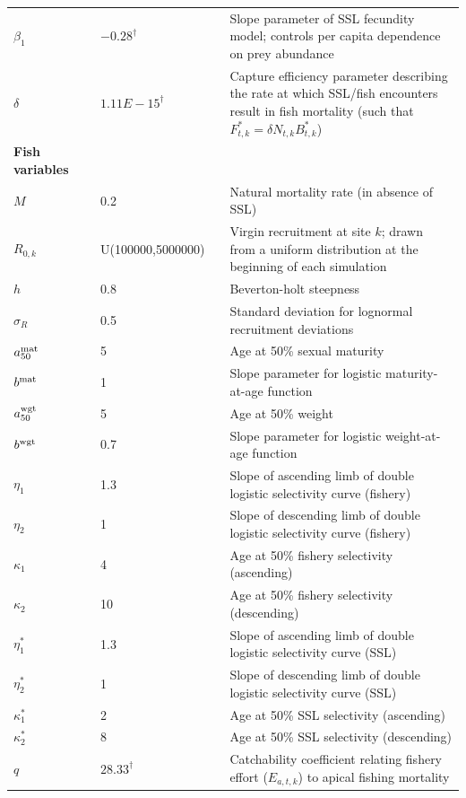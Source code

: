\documentclass[nonumbib,leqno]{nrc1}
\begin{document}
\begin{table}
\begin{tabular}{p{3cm}lll p{9cm}}
$\beta_1$ & & $-0.28^\dag$ & & Slope parameter of SSL fecundity model; controls per capita dependence
                    on prey abundance \\
$\delta$ & & $1.11E-15^\dag$ & & Capture efficiency parameter describing the rate at which SSL/fish encounters result in fish mortality (such that $F_{t,k}^*=\delta N_{t,k} B_{t,k}^*$) \\
\midrule
\multicolumn{1}{l}{\textbf{Fish variables}}  \\
$M$ & & 0.2 & & Natural mortality rate (in absence of SSL) \\ [2pt]
$R_{0,k}$ & & U(100000,5000000) & & Virgin recruitment at site $k$; drawn from a uniform distribution at the beginning of each simulation \\
$h$ & & 0.8 & & Beverton-holt steepness \\
$\sigma_R$ & & 0.5 & & Standard deviation for lognormal recruitment deviations \\
$a_{50}^{\rm mat}$ & & 5 & & Age at 50\% sexual maturity \\
$b^{\rm mat}$ & & 1 & & Slope parameter for logistic maturity-at-age function \\
$a_{50}^{\rm wgt}$ & & 5 & & Age at 50\% weight \\
$b^{\rm wgt}$ & & 0.7 & & Slope parameter for logistic weight-at-age function \\
$\eta_1$ & & 1.3 & & Slope of ascending limb of double logistic selectivity curve (fishery)\\
$\eta_2$ & & 1 & & Slope of descending limb of double logistic selectivity curve (fishery) \\
$\kappa_1$ & & 4 & & Age at 50\% fishery selectivity (ascending) \\
$\kappa_2$ & & 10 & & Age at 50\% fishery selectivity (descending) \\
$\eta_1^*$ & & 1.3 & & Slope of ascending limb of double logistic selectivity curve (SSL) \\
$\eta_2^*$ & & 1 & & Slope of descending limb of double logistic selectivity curve (SSL) \\
$\kappa_1^*$ & & 2 & & Age at 50\% SSL selectivity (ascending) \\
$\kappa_2^*$ & & 8 & & Age at 50\% SSL selectivity (descending) \\
$ q $ & & $28.33^\dag$ & & Catchability coefficient relating fishery effort ($E_{a,t,k}$) to apical fishing mortality \\
\bottomrule
\end{tabular}
\vspace{4in}
\end{table}
\end{document}
